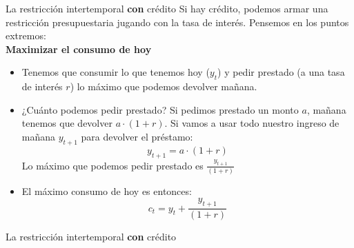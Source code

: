 \documentclass{beamer}
\begin{document}
\begin{frame}{La restricción intertemporal \textbf{con} crédito}
    Si hay crédito, podemos armar una restricción presupuestaria jugando con la tasa de interés. Pensemos en los puntos extremos: \\ \vspace{1mm}
   \textcolor{blue!70!black}{\textbf{Maximizar el consumo de hoy}} 
    \begin{itemize} \small
        \item Tenemos que consumir lo que tenemos hoy ($y_t$) y pedir prestado (a una tasa de interés $r$) lo máximo que podemos devolver mañana.
         \item ¿Cuánto podemos pedir prestado? Si pedimos prestado un monto $a$, mañana tenemos que devolver $a\cdot(1+r)$. Si vamos a usar todo nuestro ingreso de mañana $y_{t+1}$ para devolver el préstamo:
             \[y_{t+1} = a \cdot (1+r)\]
         Lo máximo que podemos pedir prestado es $\frac{y_{t+1}}{(1+r)}$
         \item El máximo consumo de hoy es entonces:
                      \[c_{t} = y_t +\frac{y_{t+1}}{(1+r)}\]
    \end{itemize}
\end{frame}

\begin{frame}{La restricción intertemporal \textbf{con} crédito}
\begin{center}
\begin{figure}[H]
\begin{center}
\end{center}
\end{figure}
\end{center} 
\end{frame}
\end{document}

